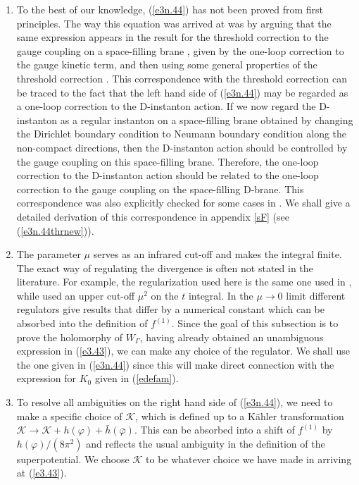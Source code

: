 \documentclass[12pt,a4paper]{article}
\newcommand{\refb}[1]{(\ref{#1})}
\newcommand{\vp}{\varphi}
\newcommand{\cK}{\mathcal{K}}
\begin{document}
\begin{enumerate}

\item
To the best of our knowledge, \refb{e3n.44} has not been proved from first principles. The way
this equation was arrived at was by arguing that the same expression appears in the result for
the threshold correction to the gauge coupling on a space-filling brane \cite{Lust:2003ky,Berg:2004ek},
given by the one-loop correction to the gauge kinetic term,
and then using some general properties of the threshold correction \cite{Kaplunovsky:1993rd}.
This correspondence with the threshold correction
can be traced to the fact that the left hand side of \refb{e3n.44} may be regarded as a one-loop
correction to the D-instanton action. If we now regard the D-instanton as a regular instanton on
a space-filling brane obtained
by changing the Dirichlet boundary condition to Neumann boundary condition along the
non-compact directions, then the D-instanton action should be controlled by the gauge
coupling on this space-filling brane.  Therefore, the one-loop correction to the D-instanton action
should be related to the one-loop correction to the gauge coupling on the space-filling D-brane.
This correspondence was also explicitly
checked for some cases in \cite{Abel:2006yk,Akerblom:2006hx}.
We shall give a detailed derivation
of this correspondence in appendix \ref{sF} (see \refb{e3n.44thrnew}).

\item
The parameter $\mu$ serves as an infrared cut-off and makes the integral finite. The exact way of
regulating the divergence is often not stated in the literature. For example, the regularization
used here is the same one used in \cite{Berg:2004ek},
while \cite{Antoniadis:1999ge} used an upper cut-off $\mu^2$ on the
$t$ integral. In the $\mu\to 0$ limit different regulators give results that differ by a numerical constant
which can be absorbed into the definition of $f^{(1)}$.
Since the goal of this subsection is to prove the holomorphy of $W_\Gamma$, having already
obtained an unambiguous expression in \refb{e3.43}, we can make any choice of the regulator.
We shall use the one given in \refb{e3n.44} since this will make direct connection with
the expression for $K_0$ given in \refb{edefam}.

\item
To resolve all ambiguities on the right hand side of \refb{e3n.44}, we need to make a specific choice of
$\cK$, which is defined up to a K\"ahler transformation $\cK\to \cK+h(\vp) + \bar h(\bar\vp)$.
This can be absorbed into a shift of $f^{(1)}$ by $h(\vp)/(8\pi^2)$ and reflects
the usual ambiguity in the definition of the superpotential.
We choose $\cK$ to be whatever choice we have made in arriving at \refb{e3.43}.


\end{enumerate}
\end{document}
